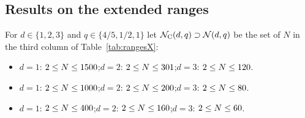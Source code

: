 \subsection{Results on the extended ranges}

\begin{table}[ht]\centering\small

\caption{Ranges of $N$ covered by the certificates of the C engine (\texttt{certs/c128\_*.jsonl}). ``New'': the number of values of $N$ not covered by Table~\ref{tab:ranges}. Columns 6 and 7: the new values of $N$ whose certificates were re-derived by the programs of Section~\ref{sec:lemmas} (identical $t_0$, $t^*$, $T$ and verdicts, intersecting enclosures). Time: total wall-clock time in seconds of the C engine and of the Python post-processing, on a heavily loaded machine.}\label{tab:rangesX}
\end{table}

For $d\in\{1,2,3\}$ and $q\in\{4/5,1/2,1\}$ let $\mathcal N_{\rm C}(d,q)\supset\mathcal N(d,q)$ be the set of $N$ in the third column of Table~\ref{tab:rangesX}:
\begin{itemize}
\item[$q=4/5$:] $d=1$: $2\le N\le1500$\XAlsoOneF;\quad $d=2$: $2\le N\le301$\XAlsoTwoF;\quad $d=3$: $2\le N\le120$\XAlsoThreeF.
\item[$q=1/2$:] $d=1$: $2\le N\le1000$\XAlsoOneH;\quad $d=2$: $2\le N\le200$\XAlsoTwoH;\quad $d=3$: $2\le N\le80$\XAlsoThreeH.
\item[$q=1$:] $d=1$: $2\le N\le400$\XAlsoOneU;\quad $d=2$: $2\le N\le160$\XAlsoTwoU;\quad $d=3$: $2\le N\le60$\XAlsoThreeU.
\end{itemize}

